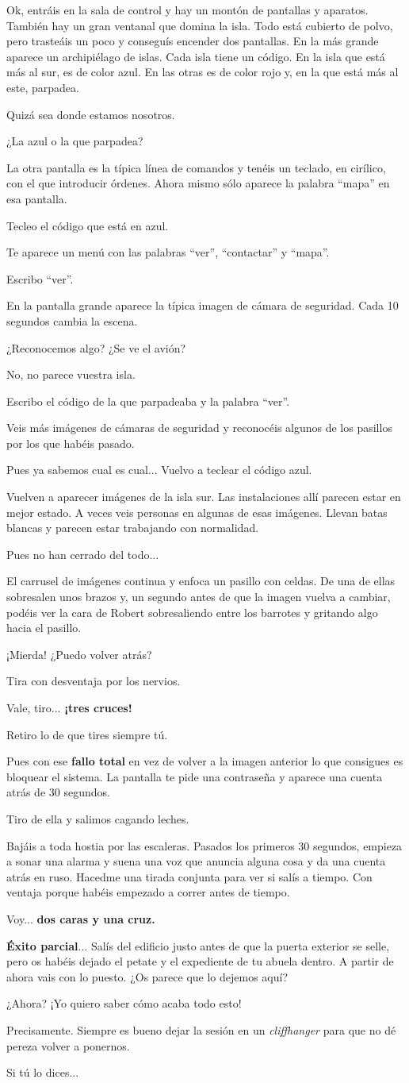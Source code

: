 \documentclass[10pt, a5paper, twocolumn]{article}
\newenvironment{dialogue}
    {\begin{description}[leftmargin=!,align=right,labelwidth=0.cm]}
    {\end{description}}
\newcommand\A{\item[\raisebox{-0.25em}{\scalebox{0.75}{\bctetraedre}}]}
\newcommand\B{\item[\raisebox{-0.25em}{\scalebox{0.75}{\bccube}}]}
\newcommand\E{\item[\raisebox{-0.25em}{\scalebox{0.75}{\bcicosaedre}}]}
\begin{document}
\begin{dialogue}
        \E Ok, entráis en la sala de control y hay un montón de pantallas y aparatos. También hay un gran ventanal que domina la isla. Todo está cubierto de polvo, pero trasteáis un poco y conseguís encender dos pantallas. En la más grande aparece un archipiélago de islas. Cada isla tiene un código. En la isla que está más al sur, es de color azul. En las otras es de color rojo y, en la que está más al este, parpadea.
        \B Quizá sea donde estamos nosotros.
        \A ¿La azul o la que parpadea?
        \E La otra pantalla es la típica línea de comandos y tenéis un teclado, en cirílico, con el que introducir órdenes. Ahora mismo sólo aparece la palabra ``mapa''  en esa pantalla.
        \A Tecleo el código que está en azul.
        \E Te aparece un menú con las palabras ``ver'', ``contactar'' y ``mapa''.
        \A Escribo ``ver''.
        \E En la pantalla grande aparece la típica imagen de cámara de seguridad. Cada 10 segundos cambia la escena.
        \B ¿Reconocemos algo? ¿Se ve el avión?
        \E No, no parece vuestra isla.
        \A Escribo el código de la que parpadeaba y la palabra ``ver''.
        \E Veis más imágenes de cámaras de seguridad y reconocéis algunos de los pasillos por los que habéis pasado.
        \A Pues ya sabemos cual es cual... Vuelvo a teclear el código azul.
        \E Vuelven a aparecer imágenes de la isla sur. Las instalaciones allí parecen estar en mejor estado. A veces veis personas en algunas de esas imágenes. Llevan batas blancas y parecen estar trabajando con normalidad.
        \B Pues no han cerrado del todo...
        \E El carrusel de imágenes continua y enfoca un pasillo con celdas. De una de ellas sobresalen unos brazos y, un segundo antes de que la imagen vuelva a cambiar, podéis ver la cara de Robert sobresaliendo entre los barrotes y gritando algo hacia el pasillo.
        \A ¡Mierda! ¿Puedo volver atrás?
        \E Tira con desventaja por los nervios.
        \A Vale, tiro... \textbf{¡tres cruces!}
        \B Retiro lo de que tires siempre tú.
        \E Pues con ese \textbf{fallo total} en vez de volver a la imagen anterior lo que consigues es bloquear el sistema. La pantalla te pide una contraseña y aparece una cuenta atrás de 30 segundos.
        \B Tiro de ella y salimos cagando leches.
        \E Bajáis a toda hostia por las escaleras. Pasados los primeros 30 segundos, empieza a sonar una alarma y suena una voz que anuncia alguna cosa y da una cuenta atrás en ruso. Hacedme una tirada conjunta para ver si salís a tiempo. Con ventaja porque habéis empezado a correr antes de tiempo.
        \B Voy... \textbf{dos caras y una cruz.}
        \E \textbf{Éxito parcial}... Salís del edificio justo antes de que la puerta exterior se selle, pero os habéis dejado el petate y el expediente de tu abuela dentro. A partir de ahora vais con lo puesto. ¿Os parece que lo dejemos aquí?
        \A ¿Ahora? ¡Yo quiero saber cómo acaba todo esto!
        \E Precisamente. Siempre es bueno dejar la sesión en un \emph{cliffhanger} para que no dé pereza volver a ponernos.
        \A Si tú lo dices...
    \end{dialogue}
\end{document}

